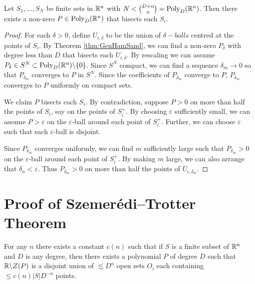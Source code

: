 \begin{corollary}
    Let $S_1, \dots , S_N$ be finite sets in $\mathbb R^n$ with $N < {{D+n}\choose{n}} = \text{Poly}_D (\mathbb R^n)$. Then there exists a non-zero $P\in \text{Poly}_D (\mathbb R^n)$ that bisects each $S_i$.  \label{thm:FiniteHamSandwich} 
\end{corollary}

\begin{proof}
    For each $\delta>0$, define $U_{i, \delta}$ to be the union of $\delta-balls$ centred at the points of $S_i$. By Theorem \ref{thm:GenHamSand}, we can find a non-zero $P_{\delta}$ with degree less than $D$ that bisects each $U_{i, \delta}$. By rescaling we can assume $P_{\delta} \in S^N \subset \text{Poly}_D (\mathbb R^n) \backslash \{0\}$.
    Since $S^N$ compact, we can find a sequence $\delta_m \to 0$ so that $P_{\delta_{m}}$ converges to $P$ in $S^N$. Since the coefficients of $P_{\delta_{m}}$ converge to $P$, $P_{\delta_{m}}$ converges to $P$ uniformly on compact sets.

    We claim $P$ bisects each $S_i$. By contradiction, suppose $P>0$ on more than half the points of $S_i$, say on the points of $S_i^+$. By choosing $\varepsilon$ sufficiently small, we can assume $P>\varepsilon$ on the $\varepsilon$-ball around each point of $S_i^+$.
    Further, we can choose $\varepsilon$ such that each $\varepsilon$-ball is disjoint. 

    Since $P_{\delta_{m}}$ converges uniformly, we can find $m$ sufficiently large such that $P_{\delta_{m}}>0$ on the $\varepsilon$-ball around each point of $S_i^+$. By making $m$ large, we can also arrange that $\delta_n < \varepsilon$.
    Thus $P_{\delta_{m}} > 0$ on more than half the points of $U_{i, \delta_{m}}$.
\end{proof}
\section{Proof of Szemerédi–Trotter Theorem}
\begin{theorem}
   For any $n$ there exists a constant $c(n)$ such that if $S$ is a finite subset of $\mathbb R^n$ and $D$ is any degree, then there exists
   a polynomial $P$ of degree $D$ such that $\mathbb R \backslash Z(P)$ is a disjoint union of $\lesssim D^n$ open sets $O_i$ each containing
   $\leq c(n) |S|D^{-n}$ points. \label{thm:PolyPartioning}
\end{theorem}


